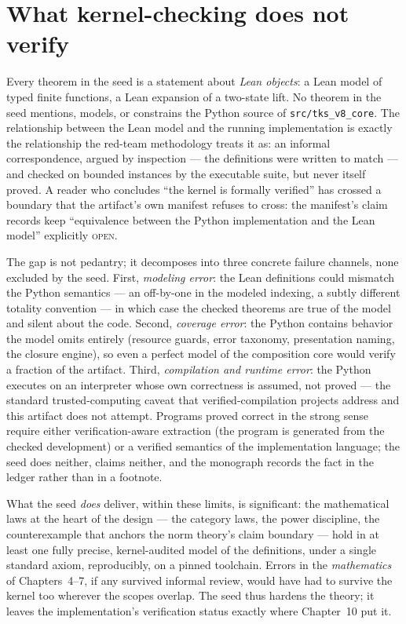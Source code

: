 \section{What kernel-checking does not verify}\label{ch11:sec:nonverification}

\begin{boundary}\label{ch11:bdy:model}
Every theorem in the seed is a statement about \emph{Lean objects}: a
Lean model of typed finite functions, a Lean expansion of a two-state
lift. No theorem in the seed mentions, models, or constrains the Python
source of \texttt{src/tks\_v8\_core}. The relationship between the Lean
model and the running implementation is exactly the relationship the
red-team methodology treats it as: an informal correspondence, argued
by inspection --- the definitions were written to match --- and
checked on bounded instances by the executable suite, but never itself
proved. A reader who concludes ``the kernel is formally verified''
has crossed a boundary that the artifact's own manifest refuses to
cross: the manifest's claim records keep ``equivalence between the
Python implementation and the Lean model'' explicitly \textsc{open}.
\end{boundary}

The gap is not pedantry; it decomposes into three concrete failure
channels, none excluded by the seed. First, \emph{modeling error}: the
Lean definitions could mismatch the Python semantics --- an off-by-one
in the modeled indexing, a subtly different totality convention --- in
which case the checked theorems are true of the model and silent about
the code. Second, \emph{coverage error}: the Python contains behavior
the model omits entirely (resource guards, error taxonomy, presentation
naming, the closure engine), so even a perfect model of the composition
core would verify a fraction of the artifact. Third, \emph{compilation
and runtime error}: the Python executes on an interpreter whose own
correctness is assumed, not proved --- the standard trusted-computing
caveat that verified-compilation projects address and this artifact
does not attempt. Programs proved correct in the strong sense require
either verification-aware extraction (the program is generated from the
checked development) or a verified semantics of the implementation
language; the seed does neither, claims neither, and the monograph
records the fact in the ledger rather than in a footnote.

What the seed \emph{does} deliver, within these limits, is
significant: the mathematical laws at the heart of the design --- the
category laws, the power discipline, the counterexample that anchors
the norm theory's claim boundary --- hold in at least one fully
precise, kernel-audited model of the definitions, under a single
standard axiom, reproducibly, on a pinned toolchain. Errors in the
\emph{mathematics} of Chapters~4--7, if any survived informal review,
would have had to survive the kernel too wherever the scopes overlap.
The seed thus hardens the theory; it leaves the implementation's
verification status exactly where Chapter~10 put it.

